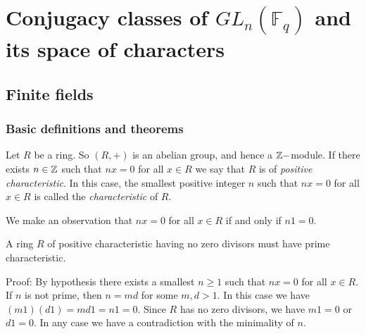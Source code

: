 \chapter{\texorpdfstring{Conjugacy classes of $GL_n(\mathbb{F}_q)$ and its space of characters}{Conjugacy classes of  and its space of characters}}

\section{Finite fields}
\subsection{Basic definitions and theorems}
\begin{dang}
    \begin{definition}\cite{lidl1994introduction}
        Let $R$ be a ring. So $(R,+)$ is an abelian group, and hence a $\mathbb{Z}-$module. If there exists $n\in\mathbb{Z}$ such that $nx=0$ for all $x\in R$ we say that $R$ is of \textit{positive characteristic}. In this case, the smallest positive integer $n$ such that $nx=0$ for all $x\in R$ is called the \textit{characteristic} of $R$.
    \end{definition}
\end{dang}
We make an observation that $nx=0$ for all $x\in R$ if and only if $n1=0$.
\begin{dang}
    \begin{theorem}\cite{lidl1994introduction}
        A ring $R$ of positive characteristic having no zero divisors must have prime characteristic. 
    \end{theorem}
\end{dang}
Proof: By hypothesis there exists a smallest $n\geq1$ such that $nx=0$ for all $x\in R$. If $n$ is not prime, then $n=md$ for some $m,d>1$. In this case we have $(m1)(d1)=md1=n1=0$. Since $R$ has no zero divisors, we have $m1=0$ or $d1=0$. In any case we have a contradiction with the minimality of $n$.

